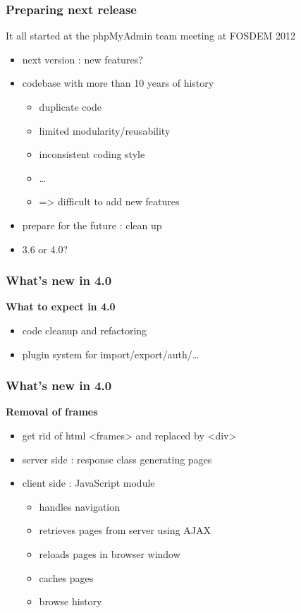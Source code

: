 \documentclass[14pt]{beamer}
\begin{document}
  \begin{frame}
    \frametitle{Preparing next release}
    \pause
    It all started at the phpMyAdmin team meeting at FOSDEM 2012
    \pause
    \begin{itemize}[<+->]
      \item next version : new features?
      \item codebase with more than 10 years of history
      \begin{itemize}[<+->]
        \item duplicate code
        \item limited modularity/reusability
        \item inconsistent coding style
	\item \ldots
	\item => difficult to add new features
      \end{itemize}
      \item prepare for the future : clean up
      \item 3.6 or 4.0? 
    \end{itemize}
  \end{frame}
  \begin{frame}
    \frametitle{What's new in 4.0}
    \textbf{{\color{PmaOlive}What to expect in 4.0}}
    \pause
    \begin{itemize}[<+->]
      \item code cleanup and refactoring
      \item plugin system for import/export/auth/\ldots
    \end{itemize}
  \end{frame}
  \begin{frame}
    \frametitle{What's new in 4.0}
    \textbf{{\color{PmaOlive}Removal of frames}}
    \pause
    \begin{itemize}[<+->]
      \item get rid of html <frames> and replaced by <div>
      \item server side : response class generating pages
      \item client side : JavaScript module 
      \begin{itemize}[<+->]
	\item handles navigation
        \item retrieves pages from server using AJAX
        \item reloads pages in browser window
	\item caches pages
	\item browse history
      \end{itemize}
    \end{itemize}
  \end{frame}
\end{document}
